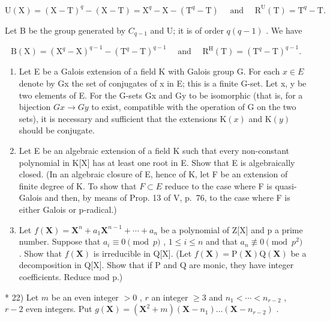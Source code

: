 \[
\mathrm{U} (\mathrm{X}) = (\mathrm{X} - \mathrm{T}) ^ {q} - (\mathrm{X} - \mathrm{T}) = \mathrm{X} ^ {q} - \mathrm{X} - (\mathrm{T} ^ {q} - \mathrm{T}) \quad \text { and } \quad \mathrm{R} ^ {\mathrm{U}} (\mathrm{T}) = \mathrm{T} ^ {q} - \mathrm{T}.
\]

Let B be the group generated by \(C_{q-1}\) and U; it is of order \(q(q-1)\) . We have

\[
\mathrm{B} (\mathrm{X}) = \left(\mathrm{X} ^ {q} - \mathrm{X}\right) ^ {q - 1} - \left(\mathrm{T} ^ {q} - \mathrm{T}\right) ^ {q - 1} \quad \text { and } \quad \mathrm{R} ^ {\mathrm{H}} (\mathrm{T}) = \left(\mathrm{T} ^ {q} - \mathrm{T}\right) ^ {q - 1}.
\]

\begin{enumerate}
\def\labelenumi{\arabic{enumi})}
\setcounter{enumi}{18}
\item
  Let E be a Galois extension of a field K with Galois group G. For each \(x \in E\) denote by Gx the set of conjugates of x in E; this is a finite G-set. Let x, y be two elements of E. For the G-sets Gx and Gy to be isomorphic (that is, for a bijection \(Gx \rightarrow Gy\) to exist, compatible with the operation of G on the two sets), it is necessary and sufficient that the extensions \(\mathrm{K}(x)\) and \(\mathrm{K}(y)\) should be conjugate.
\item
  Let E be an algebraic extension of a field K such that every non-constant polynomial in K{[}X{]} has at least one root in E. Show that E is algebraically closed. (In an algebraic closure of E, hence of K, let F be an extension of finite degree of K. To show that \(F \subset E\) reduce to the case where F is quasi-Galois and then, by means of Prop. 13 of V, p.~76, to the case where F is either Galois or p-radical.)
\item
  Let \(f(\mathbf{X}) = \mathbf{X}^{n} + a_{1}\mathbf{X}^{n-1} + \cdots + a_{n}\) be a polynomial of Z{[}X{]} and p a prime number. Suppose that \(a_{i} \equiv 0 \pmod{p}\) , \(1 \leqslant i \leqslant n\) and that \(a_{n} \not\equiv 0 \pmod{p^{2}}\) . Show that \(f(\mathbf{X})\) is irreducible in Q{[}X{]}. (Let \(f(\mathbf{X}) = \mathrm{P}(\mathbf{X}) \mathrm{Q}(\mathbf{X})\) be a decomposition in Q{[}X{]}. Show that if P and Q are monic, they have integer coefficients. Reduce mod p.)
\end{enumerate}

* 22) Let \(m\) be an even integer \(>0\) , \(r\) an integer \(\geqslant 3\) and \(n_1 < \cdots < n_{r-2}\) , \(r-2\) even integers. Put \(g(\mathbf{X}) = (\mathbf{X}^2 + m)(\mathbf{X} - n_1) \ldots (\mathbf{X} - n_{r-2})\) .


